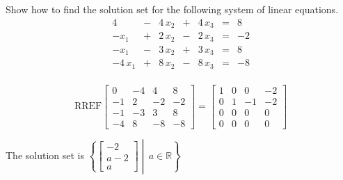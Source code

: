 
\begin{exerciseStatement}


Show how to find the solution set for the following system of linear equations. 
\begin{alignat*}{4}  &-& 4 \, x_{2} &+& 4 \, x_{3} &=& 8 \\-x_{1} &+& 2 \, x_{2} &-& 2 \, x_{3} &=& -2 \\-x_{1} &-& 3 \, x_{2} &+& 3 \, x_{3} &=& 8 \\-4 \, x_{1} &+& 8 \, x_{2} &-& 8 \, x_{3} &=& -8 \\ \end{alignat*}
            


\end{exerciseStatement}
    
\begin{exerciseAnswer} 
\[\mathrm{RREF} \left[\begin{array}{ccc|c}
0 & -4 & 4 & 8 \\
-1 & 2 & -2 & -2 \\
-1 & -3 & 3 & 8 \\
-4 & 8 & -8 & -8
\end{array}\right]  =  \left[\begin{array}{ccc|c}
1 & 0 & 0 & -2 \\
0 & 1 & -1 & -2 \\
0 & 0 & 0 & 0 \\
0 & 0 & 0 & 0
\end{array}\right] \]

The solution set is \( \left\{ \left[\begin{array}{c}
-2 \\
a - 2 \\
a
\end{array}\right] \middle|\,a\in\mathbb{R}\right\} \)


\end{exerciseAnswer}
    
